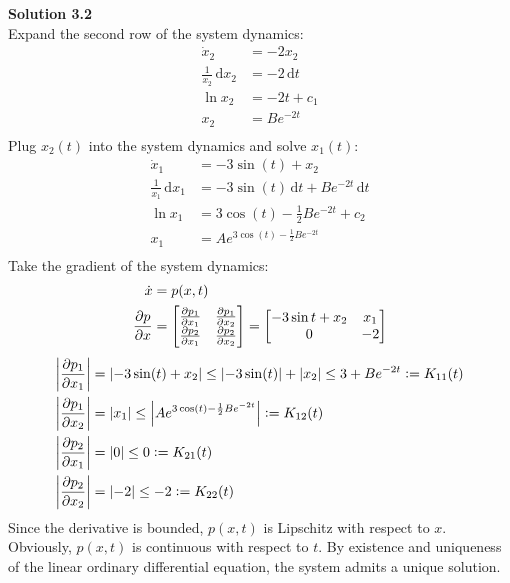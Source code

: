 \documentclass[fleqn, 10.5pt, a4paper]{article}
\theoremstyle{definition}
\numberwithin{equation}{section}
\newenvironment{mymat}{\left[\begin{matrix}}{\end{matrix}\right]}
\newcommand{\defeq}{\vcentcolon=}
\newcommand{\abs}[1]{\left|#1\right|}
\newcommand{\dt}{\, \mathrm{d} t}
\newcommand{\dx}{\, \mathrm{d} x}
\begin{document}
\noindent \textbf {Solution 3.2} \\
Expand the second row of the system dynamics:
\begin{align*}
	\dot{x}_2 &= -2x_2 \\
	\frac{1}{x_2} \dx _2 &= -2 \dt \\
	\ln x_2 &= -2t + c_1 \\
	x_2 &= Be^{-2t} \\
\end{align*}
Plug $x_2(t)$ into the system dynamics and solve $x_1(t)$:
\begin{align*}
	\dot{x}_1 &= -3 \sin (t) + x_2 \\
	\frac{1}{x_1}\dx _1 &= -3\sin (t) \dt + Be^{-2t}\dt \\
	\ln x_1 &= 3 \cos(t) - \frac{1}{2} Be^{-2t} + c_2\\
	x_1 &= Ae^{3 \cos(t)- \frac{1}{2} Be^{-2t}}\\
\end{align*}
Take the gradient of the system dynamics:
\begin{align*}
\dot{x} &= p(x,t) \\
\frac{\partial p}{\partial x} &=  \begin{mymat}\frac{\partial p_1}{\partial x_1} & \frac{\partial p_1}{\partial x_2} \\
\frac{\partial p_2}{\partial x_1} & \frac{\partial p_2}{\partial x_2}
\end{mymat} = \begin{mymat}
-3\sin t + x_2 & x_1 \\
0 & -2
\end{mymat}
\end{align*}
\begin{align*}
\abs{\frac{\partial p_1}{\partial x_1}} &= \abs{-3\sin(t)+x_2} \leq \abs{-3\sin(t)} + \abs{x_2} \leq 3 + Be^{-2t} \defeq K_{11}(t)\\
\abs{\frac{\partial p_1}{\partial x_2}} &= \abs{x_1} \leq \abs{Ae^{3 \cos(t)- \frac{1}{2} Be^{-2t}}} \defeq K_{12}(t) \\
\abs{\frac{\partial p_2}{\partial x_1}} &= \abs{0} \leq 0 \defeq K_{21}(t) \\
\abs{\frac{\partial p_2}{\partial x_2}} &= \abs{-2} \leq -2 \defeq K_{22}(t)
\end{align*}
Since the derivative is bounded, $p(x,t)$ is Lipschitz with respect to $x$. Obviously, $p(x,t)$ is continuous with respect to $t$. By existence and uniqueness of the linear ordinary differential equation, the system admits a unique solution.
\end{document}
